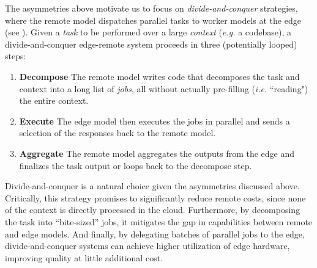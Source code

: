 The asymmetries above motivate us to focus on \emph{divide-and-conquer} strategies, where the remote model dispatches parallel tasks to worker models at the edge (see ).
% 
Given a \textit{task}  to be performed over a large \textit{context} (\textit{e.g.} a codebase), a divide-and-conquer edge-remote system proceeds in three (potentially looped) steps:
\begin{enumerate}
    \item \textbf{Decompose} The remote model writes code that decomposes the task and context into a long list of \textit{jobs}, all without actually pre-filling (\textit{i.e.} ``reading") the entire context.
    \item \textbf{Execute} The edge model then executes the jobs in parallel and sends a selection of the responses back to the remote model.
    \item \textbf{Aggregate} The remote model aggregates the outputs from the edge and finalizes the task output or loops back to the decompose step.
\end{enumerate}
% 
Divide-and-conquer is a natural choice given the asymmetries discussed above. Critically, this strategy promises to significantly reduce remote costs, since none of the context is directly processed in the cloud. Furthermore, by decomposing the task into “bite-sized” jobs, it mitigates the gap in capabilities between remote and edge models. And finally, by delegating batches of parallel jobs to the edge, divide-and-conquer systems can achieve higher utilization of edge hardware, improving quality at little additional cost. 


